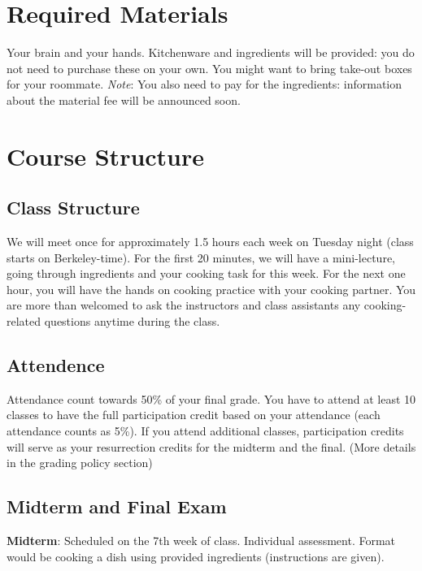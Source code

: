 \documentclass[11pt]{article}
\begin{document}
\section*{Required Materials}


Your brain and your hands. Kitchenware and ingredients will be provided: you do not need to purchase these on your own. You might want to bring take-out boxes for your roommate. \textit{Note}: You also need to pay for the ingredients: information about the material fee will be announced soon. 



\section*{Course Structure}

\subsection*{Class Structure}

We will meet once for approximately 1.5 hours each week on Tuesday night (class starts on Berkeley-time). For the first 20 minutes, we will have a mini-lecture, going through ingredients and your cooking task for this week. For the next one hour, you will have the hands on cooking practice with your cooking partner. You are more than welcomed to ask the instructors and class assistants any cooking-related questions anytime during the class. 

\subsection*{Attendence}

Attendance count towards 50\% of your final grade. You have to attend at least 10 classes to have the full participation credit based on your attendance (each attendance counts as 5\%). If you attend additional classes, participation credits will serve as your resurrection credits for the midterm and the final. (More details in the grading policy section) 

\subsection*{Midterm and Final Exam}

\textbf{Midterm}: Scheduled on the 7th week of class. Individual assessment. Format would be cooking a dish using provided ingredients (instructions are given). 
\end{document}
